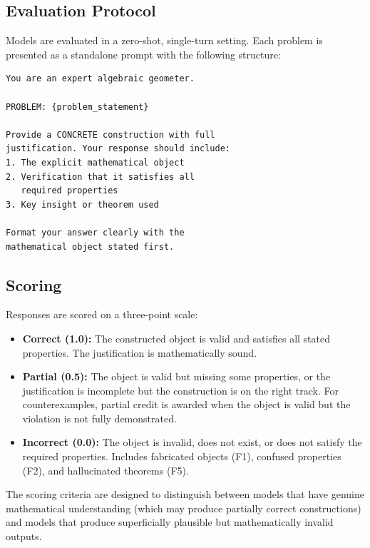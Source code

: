 \subsection{Evaluation Protocol}

Models are evaluated in a zero-shot, single-turn setting.
Each problem is presented as a standalone prompt with the following structure:

\begin{lstlisting}[caption={Evaluation prompt template (abbreviated; full version in Appendix~\ref{app:prompt}).},label={lst:prompt}]
You are an expert algebraic geometer.

PROBLEM: {problem_statement}

Provide a CONCRETE construction with full
justification. Your response should include:
1. The explicit mathematical object
2. Verification that it satisfies all
   required properties
3. Key insight or theorem used

Format your answer clearly with the
mathematical object stated first.
\end{lstlisting}

\subsection{Scoring}

Responses are scored on a three-point scale:
\begin{itemize}[nosep]
  \item \textbf{Correct (1.0):} The constructed object is valid and satisfies all stated properties. The justification is mathematically sound.
  \item \textbf{Partial (0.5):} The object is valid but missing some properties, or the justification is incomplete but the construction is on the right track. For counterexamples, partial credit is awarded when the object is valid but the violation is not fully demonstrated.
  \item \textbf{Incorrect (0.0):} The object is invalid, does not exist, or does not satisfy the required properties. Includes fabricated objects (F1), confused properties (F2), and hallucinated theorems (F5).
\end{itemize}

The scoring criteria are designed to distinguish between models that have genuine mathematical understanding (which may produce partially correct constructions) and models that produce superficially plausible but mathematically invalid outputs.
